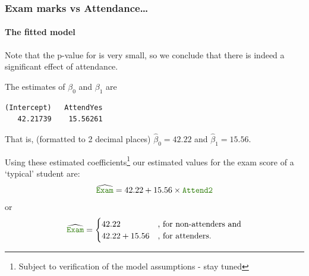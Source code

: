 \documentclass{beamer}\usepackage[]{graphicx}\usepackage[]{xcolor}
\makeatletter
\newenvironment{kframe}{%
 \def\at@end@of@kframe{}%
 \ifinner\ifhmode%
  \def\at@end@of@kframe{\end{minipage}}%
  \begin{minipage}{\columnwidth}%
 \fi\fi%
 \def\FrameCommand##1{\hskip\@totalleftmargin \hskip-\fboxsep
 \colorbox{shadecolor}{##1}\hskip-\fboxsep
     \hskip-\linewidth \hskip-\@totalleftmargin \hskip\columnwidth}%
 \MakeFramed {\advance\hsize-\width
   \@totalleftmargin\z@ \linewidth\hsize
   \@setminipage}}%
 {\par\unskip\endMakeFramed%
 \at@end@of@kframe}
\newenvironment{knitrout}{}{} %
\makeatother
\begin{document}
\begin{frame}[fragile]
\frametitle{Exam marks vs Attendance\ldots}
\framesubtitle{The fitted model}
Note that the p-value for  is very small, so we conclude that there is indeed a significant effect of attendance.
\medskip

The estimates of $\beta_0$ and $\beta_1$ are
\begin{knitrout}\scriptsize
{}\color{fgcolor}\begin{kframe}
\begin{verbatim}
(Intercept)   AttendYes 
   42.21739    15.56261 
\end{verbatim}
\end{kframe}
\end{knitrout}
That is, (formatted to 2 decimal places) $\hat{\beta}_0=42.22$ and $\hat{\beta}_1=15.56$.
\medskip

Using these estimated coefficients\footnote{Subject to verification of the model assumptions - stay tuned} 
our estimated values for the exam score of a `typical' student are:
\[
\widehat{\rcode{Exam}}= 42.22 + 15.56\times {\rcode{Attend2}}
\]
or
\[
\widehat{\rcode{Exam}}= 
\begin{cases}
  42.22 &\mbox{, for non-attenders and} \\
  42.22 + 15.56 &\mbox{, for attenders.}
\end{cases}
\]
\end{frame}
\end{document}
